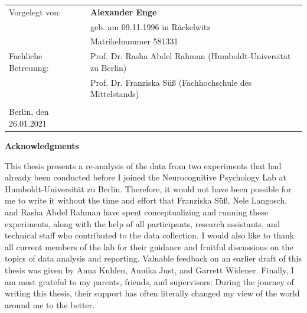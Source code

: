 \documentclass[
  english,
  doc,12pt,twoside,floatsintext]{apa7}
\begin{document}
\begin{flushleft}
{
\begin{tabular}{ll}
Vorgelegt von:&\textbf{Alexander Enge}\\
&geb. am 09.11.1996 in Räckelwitz\\
&Matrikelnummer 581331\\
Fachliche Betreuung:&Prof. Dr. Rasha Abdel Rahman (Humboldt-Universität zu Berlin)\\
&Prof. Dr. Franziska Süß (Fachhochschule des Mittelstands)\\
&\\
Berlin, den 26.01.2021&\\
\end{tabular}
}
\end{flushleft}

\clearpage

\mbox{}\thispagestyle{empty}\clearpage

\thispagestyle{empty}

\vspace*{55mm}

\begin{center}\textbf{Acknowledgments}\end{center}

This thesis presents a re-analysis of the data from two experiments that had already been conducted before I joined the Neurocognitive Psychology Lab at Humboldt-Universität zu Berlin. Therefore, it would not have been possible for me to write it without the time and effort that Franziska Süß, Nele Langosch, and Rasha Abdel Rahman have spent conceptualizing and running these experiments, along with the help of all participants, research assistants, and technical staff who contributed to the data collection. I would also like to thank all current members of the lab for their guidance and fruitful discussions on the topics of data analysis and reporting. Valuable feedback on an earlier draft of this thesis was given by Anna Kuhlen, Annika Just, and Garrett Widener. Finally, I am most grateful to my parents, friends, and supervisors: During the journey of writing this thesis, their support has often literally changed my view of the world around me to the better.

\clearpage

\mbox{}\thispagestyle{empty}\clearpage

\thispagestyle{empty}

\vspace*{45mm}
\end{document}

